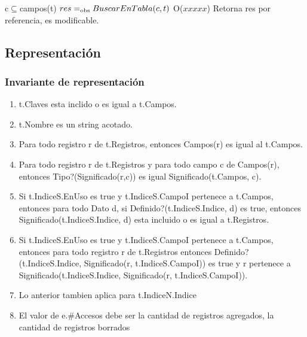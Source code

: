  {c$\subseteq$campos(t)}
 {$res =_{\mathrm{obs}} BuscarEnTabla(c, t)$}
 {}
 {O($xxxxx$)}
 {Retorna res por referencia, es modificable.} 
 
\newpage
\subsection{Representación}

{
{ 
}
}

  
\subsubsection*{Invariante de representación}

\begin{enumerate}
\item	t.Claves esta inclido o es igual a t.Campos.
% 
\item	t.Nombre es un string acotado.
\item	Para todo registro r de t.Registros, entonces Campos(r) es igual al t.Campos.
\item	Para todo registro r de t.Registros y para todo campo c de Campos(r), entonces Tipo?(Significado(r,c)) es igual Significado(t.Campos, c).
\item	Si t.IndiceS.EnUso es true y t.IndiceS.CampoI pertenece a t.Campos, entonces para todo Dato d, si Definido?(t.IndiceS.Indice, d) es true, entonces Significado(t.IndiceS.Indice, d) esta incluido o es igual a t.Registros.
\item	Si t.IndiceS.EnUso es true y t.IndiceS.CampoI pertenece a t.Campos, entonces para todo registro r de t.Registros entonces Definido?(t.IndiceS.Indice, Significado(r, t.IndiceS.CampoI)) es true y r pertenece a Significado(t.IndiceS.Indice, Significado(r, t.IndiceS.CampoI)).
%
\item	Lo anterior tambien aplica para t.IndiceN.Indice
  \item El valor de e.\#Accesos debe ser la cantidad de registros agregados, la cantidad de registros borrados
\end{enumerate}

